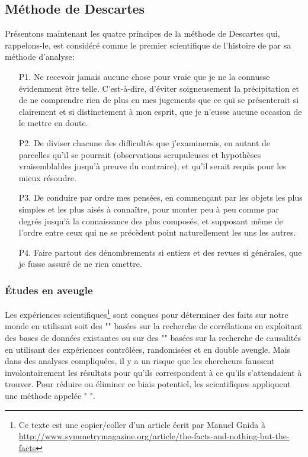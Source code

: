 	\subsection{Méthode de Descartes}
	Présentons maintenant les quatre principes de la méthode de Descartes qui, rappelons-le, est considéré comme le premier scientifique de l'histoire de par sa méthode d'analyse:
	\begin{itemize}
	\item[P1.] Ne recevoir jamais aucune chose pour vraie que je ne la connusse évidemment être telle. C'est-à-dire, d'éviter soigneusement la précipitation et de ne comprendre rien de plus en mes jugements que ce qui se présenterait si clairement et si distinctement à mon esprit, que je n'eusse aucune occasion de le mettre en doute.
	
	\item[P2.] De diviser chacune des difficultés que j'examinerais, en autant de parcelles qu'il se pourrait (observations scrupuleuses et hypothèses vraisemblables jusqu'à preuve du contraire), et qu'il serait requis pour les mieux résoudre.
	
	\item[P3.] De conduire par ordre mes pensées, en commençant par les objets les plus simples et les plus aisés à connaître, pour monter peu à peu comme par degrés jusqu'à la connaissance des plus composés, et supposant même de l'ordre entre ceux qui ne se précèdent point naturellement les uns les autres.
	
	\item[P4.] Faire partout des dénombrements si entiers et des revues si générales, que je fusse assuré de ne rien omettre.
	\end{itemize}	

	\subsubsection{Études en aveugle}
	Les expériences scientifiques\footnote{Ce texte est une copier/coller d'un article écrit par Manuel Gnida à \url{http://www.symmetrymagazine.org/article/the-facts-and-nothing-but-the-facts}} sont conçues pour déterminer des faits sur notre monde en utilisant soit des "" basées sur la recherche de corrélations en exploitant des bases de données existantes ou sur des "" basées sur la recherche de causalités en utilisant des expériences contrôlées, randomisées et en double aveugle. Mais dans des analyses compliquées, il y a un risque que les chercheurs faussent involontairement les résultats pour qu'ils correspondent à ce qu'ils s'attendaient à trouver. Pour réduire ou éliminer ce biais potentiel, les scientifiques appliquent une méthode appelée " ".
	
